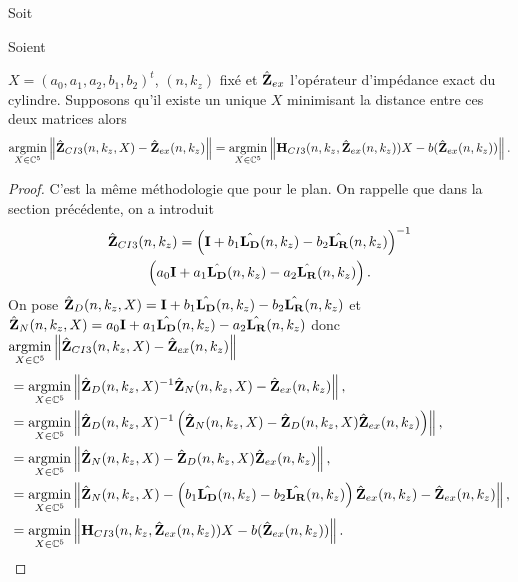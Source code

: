     \begin{prop}
      Soit
\begin{REM}
  Soient
\end{REM} 
       \(X = (a_0,a_1,a_2,b_1,b_2)^t\), \((n,k_z)\) fixé et \(\hat{\mathbf{Z}}_{ex}\) l'opérateur d'impédance exact du cylindre.
      Supposons qu'il existe un unique \(X\) minimisant la distance entre ces deux matrices alors
      \begin{equation*}
        {\underset{X\in\mathbb C^5}{\operatorname{argmin}}} \left\lVert\hat{\mathbf{Z}}_{CI3}(n,k_z,X) - \hat{\mathbf{Z}}_{ex}(n,k_z)\right\rVert = {\underset{X\in\mathbb C^5}{\operatorname{argmin}}} \left\lVert\mathbf{H}_{CI3}(n,k_z,\hat{\mathbf{Z}}_{ex}(n,k_z))X - b(\hat{\mathbf{Z}}_{ex}(n,k_z))\right\rVert.
      \end{equation*}
    \end{prop}

    \begin{proof}
      C'est la même méthodologie que pour le plan.
      On rappelle que dans la section précédente, on a introduit
      \begin{multline*}
        \hat{\mathbf{Z}}_{CI3}(n,k_z) = \left(\mathbf{I} + b_1 \hat{\mathbf{L_D}}(n,k_z) - b_2 \hat{\mathbf{L_R}}(n,k_z) \right)^{-1}\\\left(a_0 \mathbf{I} + a_1 {\hat{\mathbf{L_D}}(n,k_z)} - a_2 {\hat{\mathbf{L_R}}(n,k_z)}\right).
      \end{multline*}
      On pose \(\hat{\mathbf{Z}}_D(n,k_z,X) = \mathbf{I} + b_1 \hat{\mathbf{L_D}}(n,k_z) - b_2 \hat{\mathbf{L_R}}(n,k_z)\) et \(\hat{\mathbf{Z}}_N(n,k_z,X) = a_0 \mathbf{I} + a_1 {\hat{\mathbf{L_D}}(n,k_z)} - a_2 {\hat{\mathbf{L_R}}(n,k_z)}\) donc \({\underset{X\in\mathbb C^5}{\operatorname{argmin}}} \left\lVert\hat{\mathbf{Z}}_{CI3}(n,k_z,X) - \hat{\mathbf{Z}}_{ex}(n,k_z)\right\rVert\)
      \begin{align*}
      & = {\underset{X\in\mathbb C^5}{\operatorname{argmin}}} \left\lVert\hat{\mathbf{Z}}_D(n,k_z,X)^{-1}\hat{\mathbf{Z}}_N(n,k_z,X) - \hat{\mathbf{Z}}_{ex}(n,k_z) \right\rVert,
      \\
      &= {\underset{X\in\mathbb C^5}{\operatorname{argmin}}} \left\lVert\hat{\mathbf{Z}}_D(n,k_z,X)^{-1}\left(\hat{\mathbf{Z}}_N(n,k_z,X) - \hat{\mathbf{Z}}_D(n,k_z,X)\hat{\mathbf{Z}}_{ex}(n,k_z)\right) \right\rVert,
      \\
      &= {\underset{X\in\mathbb C^5}{\operatorname{argmin}}} \left\lVert\hat{\mathbf{Z}}_N(n,k_z,X) - \hat{\mathbf{Z}}_D(n,k_z,X)\hat{\mathbf{Z}}_{ex}(n,k_z)\right\rVert,
      \\
      &= {\underset{X\in\mathbb C^5}{\operatorname{argmin}}} \left\lVert\hat{\mathbf{Z}}_N(n,k_z,X) - \left(b_1 \hat{\mathbf{L_D}}(n,k_z) - b_2 \hat{\mathbf{L_R}}(n,k_z)\right)\hat{\mathbf{Z}}_{ex}(n,k_z) - \hat{\mathbf{Z}}_{ex}(n,k_z) \right\rVert,
      \\
      &= {\underset{X\in\mathbb C^5}{\operatorname{argmin}}} \left\lVert\mathbf{H}_{CI3}(n,k_z,\hat{\mathbf{Z}}_{ex}(n,k_z))X - b(\hat{\mathbf{Z}}_{ex}(n,k_z))\right\rVert.
      \end{align*}
    \end{proof}

